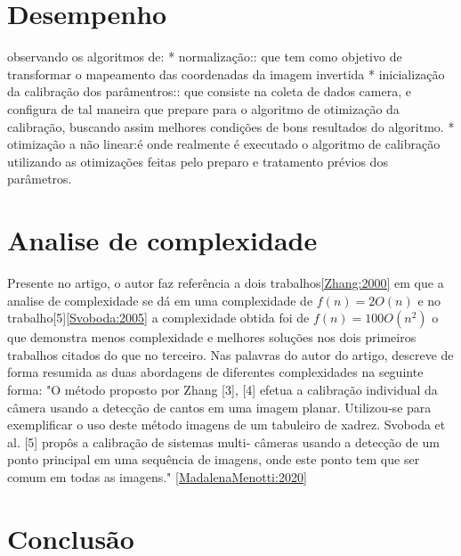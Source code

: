 \documentclass[portuguese]{sbrt}
\begin{document}
\section{Desempenho} 
\label{sec:desempenho}
observando os algoritmos de:
* normalização:: que tem como objetivo de transformar o mapeamento das coordenadas da imagem invertida
* inicialização da calibração dos parâmentros:: que consiste na coleta de dados camera, e configura de tal maneira que prepare para o algoritmo de otimização da calibração, buscando assim melhores condições de bons resultados do algoritmo.
* otimização a não linear:é onde realmente é executado o algoritmo de calibração utilizando as otimizações feitas pelo preparo e tratamento prévios dos parâmetros.

\section{Analise de complexidade}
\label{sec:analise_complexidade}
Presente no artigo, o autor faz referência a dois trabalhos\ref{Zhang:2000} em que a analise de complexidade se dá em uma complexidade de $f(n) = 2O(n)$ e no trabalho[5]\ref{Svoboda:2005} a complexidade obtida foi de $f(n) = 100O(n^2)$ o que demonstra menos complexidade e melhores soluções nos dois primeiros trabalhos citados do que no terceiro. Nas palavras do autor do artigo, descreve de forma resumida as duas abordagens de diferentes complexidades na seguinte forma: "O método proposto por Zhang [3], [4] efetua a calibração
individual da câmera usando a detecção de cantos em uma
imagem planar. Utilizou-se para exemplificar o uso deste
método imagens de um tabuleiro de xadrez.
Svoboda et al. [5] propôs a calibração de sistemas multi-
câmeras usando a detecção de um ponto principal em uma
sequência de imagens, onde este ponto tem que ser comum
em todas as imagens." \ref{MadalenaMenotti:2020}
\section{Conclusão}
\label{sec:conclusao}


 

\end{document}
